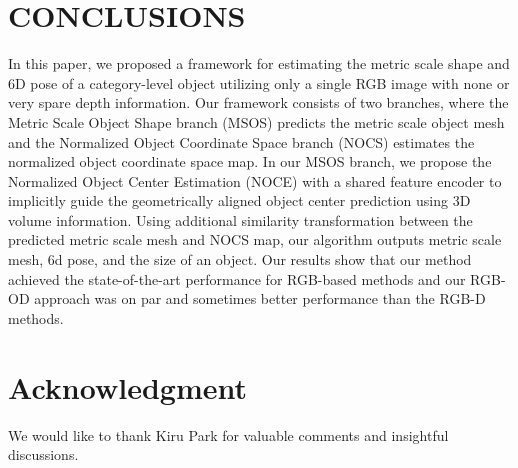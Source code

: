 \documentclass[letterpaper, 10 pt, journal, twoside]{IEEEtran}
\begin{document}

\section{CONCLUSIONS}
In this paper, we proposed a framework for estimating the metric scale shape and 6D pose of a category-level object utilizing only a single RGB image with none or very spare depth information.
Our framework consists of two branches, where the Metric Scale Object Shape branch (MSOS) predicts the metric scale object mesh and the Normalized Object Coordinate Space branch (NOCS) estimates the normalized object coordinate space map.
In our MSOS branch, we propose the Normalized Object Center Estimation (NOCE) with a shared feature encoder to implicitly guide the geometrically aligned object center prediction using 3D volume information.
Using additional similarity transformation between the predicted metric scale mesh and NOCS map, our algorithm outputs metric scale mesh, 6d pose, and the size of an object.
Our results show that our method achieved the state-of-the-art performance for RGB-based methods and our RGB-OD approach was on par and sometimes better performance than the RGB-D methods.


\section*{Acknowledgment}
We would like to thank Kiru Park for valuable comments and insightful discussions.

{\small


}


\end{document}
